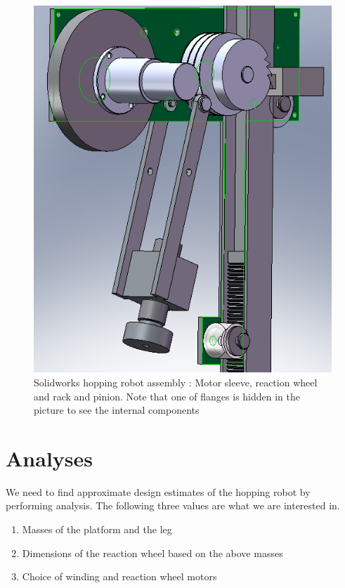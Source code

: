 \begin{figure}[!htp]
\centering
\includegraphics[scale=0.8]{fig/hopper_detach.png}
\caption[Solidworks hopping robot assembly]{Solidworks hopping robot assembly : Motor sleeve, reaction wheel and rack and pinion. Note that one of flanges is hidden in the picture to see the internal components}
\label{fig:3_solidworks1}
\end{figure}

\section{Analyses}
\label{sec_4:analyses}
We need to find approximate design estimates of the hopping robot by performing analysis. The following three values are what we are interested in.
\begin{enumerate}
\item
Masses of the platform and the leg
\item
Dimensions of the reaction wheel based on the above masses
\item
Choice of winding and reaction wheel motors
\end{enumerate}

